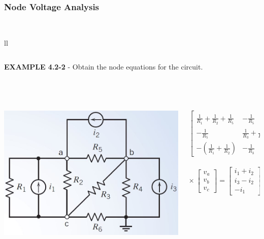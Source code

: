 \documentclass[aspectratio=169]{beamer}
\begin{document}
\begin{frame}[fragile]
	\frametitle{Node Voltage Analysis}

\

\begin{tabular}{ll}
	\begin{columns}[c]	\column{1\textwidth}
		\textbf{ EXAMPLE 4.2-2} - Obtain the node equations for the circuit.\\
\begin{center}
{}
\end{center}
	\end{columns} \\
	\begin{columns}
		\begin{column}{0.4\textwidth}  %
		\includegraphics[width=1.1\textwidth]{figura4_26.jpg}\\	
		\end{column}
		\begin{column}{0.6\textwidth}  %
			\[ 
			\left[\begin{array}{ccc}
			\frac{1}{R_{1}}+\frac{1}{R_{2}}+\frac{1}{R_{5}} & -\frac{1}{R_{5}} & -(\frac{1}{R_{1}}+\frac{1}{R_{2}})\\
			-\frac{1}{R_{5}} & \frac{1}{R_{3}}+\frac{1}{R_{4}}+\frac{1}{R_{5}} & -\frac{1}{R_{3}} \\
			-(\frac{1}{R_{1}}+\frac{1}{R_{2}}) & -\frac{1}{R_{3}} & \frac{1}{R_{1}}+\frac{1}{R_{2}}+\frac{1}{R_{3}}+\frac{1}{R_{6}} \end{array} \right] \] \\ \[ \times\
			\left[\begin{array}{c}
			v_{a} \\
			v_{b} \\
			 v_{c}\end{array} \right]= 
			\left[\begin{array}{c}
			i_{1}+i_{2} \\
			i_{3}-i_{2} \\
			-i_{1}  \end{array} \right]
			\]	
		\end{column}
	\end{columns}\\


\end{tabular}
\end{frame}
\end{document}
